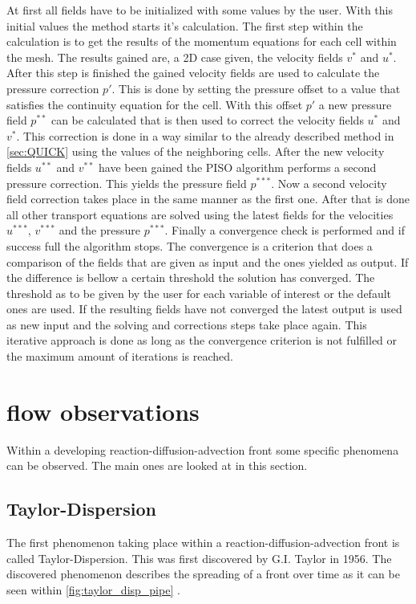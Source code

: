 \documentclass[../thesis.tex]{subfiles}
\begin{document}
At first all fields have to be initialized with some values by the user. With this initial values the method starts it's calculation. The first step within the calculation is to get the results of the momentum equations for each cell within the mesh. The results gained are, a 2D case given, the velocity fields $v^*$ and $u^*$. After this step is finished the gained velocity fields are used to calculate the pressure correction $p'$. This is done by setting the pressure offset to a value that satisfies the continuity equation for the cell. With this offset $p'$ a new pressure field $p^{**}$ can be calculated that is then used to correct the velocity fields $u^*$ and $v^*$. This correction is done in a way similar to the already described method in \autoref{sec:QUICK} using the values of the neighboring cells. After the new velocity fields $u^{**}$ and $v^{**}$ have been gained the PISO algorithm performs a second pressure correction. This yields the pressure field $p^{***}$. Now a second velocity field correction takes place in the same manner as the first one. After that is done all other transport equations are solved using the latest fields for the velocities $u^{***}$, $v^{***}$ and the pressure $p^{***}$. Finally a convergence check is performed and if success full the algorithm stops. The convergence is a criterion that does a comparison of the fields that are given as input and the ones yielded as output. If the difference is bellow a certain threshold the solution has converged. The threshold as to be given by the user for each variable of interest or the default ones are used. If the resulting fields have not converged the latest output is used as new input and the solving and corrections steps take place again. This iterative approach is done as long as the convergence criterion is not fulfilled or the maximum amount of iterations is reached.


\section{flow observations}

Within a developing reaction-diffusion-advection front some specific phenomena can be observed. The main ones are looked at in this section.

\subsection{Taylor-Dispersion}

The first phenomenon taking place within a reaction-diffusion-advection front is called Taylor-Dispersion. This was first discovered by G.I. Taylor\cite{aris1956dispersion} in 1956. The discovered phenomenon describes the spreading of a front over time as it can be seen within \autoref{fig:taylor_disp_pipe} . 
\end{document}
